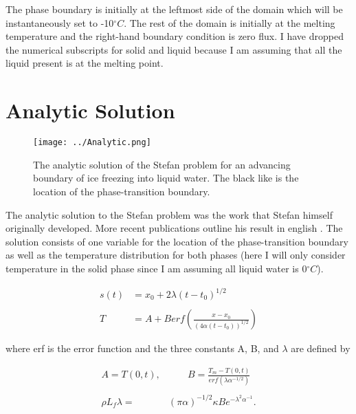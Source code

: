 \documentclass[12pt]{article}
\begin{document}
The phase boundary is initially at the leftmost side of the domain which will be instantaneously set to -10$^\circ C$. The rest of the domain is initially at the melting temperature and the right-hand boundary condition is zero flux. I have dropped the numerical subscripts for solid and liquid because I am assuming that all the liquid present is at the melting point.

\section{Analytic Solution}

\begin{figure}[!b]
\centering
\texttt{[image: ../Analytic.png]}
\caption{The analytic solution of the Stefan problem for an advancing boundary of ice freezing into liquid water. The black like is the location of the phase-transition boundary.}
\label{AnalyticPlot}
\end{figure}

The analytic solution to the Stefan problem was the work that Stefan himself originally developed. More recent publications outline his result in english \citep[i.e.][]{Carslaw1959,Sarler1995}. The solution consists of one variable for the location of the phase-transition boundary as well as the temperature distribution for both phases (here I will only consider temperature in the solid phase since I am assuming all liquid water is 0$^\circ C$).

\begin{equation}
\begin{aligned}
s(t) &= x_0 + 2\lambda (t-t_0)^{1/2} \\~\\
T &= A + B erf \left( \frac{x-x_0}{(4 \alpha (t-t_0))^{1/2}} \right) 
\end{aligned}
\end{equation}

where erf is the error function and the three constants A, B, and $\lambda$ are defined by 

\begin{equation}
\begin{aligned}
A = T(0,t),& \hspace{2em} 
B = \frac{T_m - T(0,t)}{erf(\lambda \alpha^{-1/2})} \\~\\
\rho L_f \lambda = &(\pi \alpha)^{-1/2} \kappa B e^{-\lambda^2 \alpha^{-1}}.
\end{aligned}
\end{equation}
\end{document}
